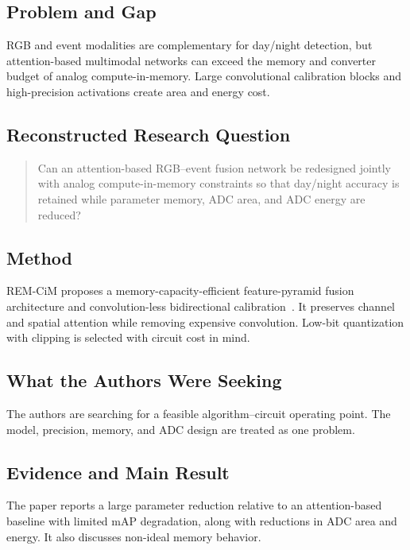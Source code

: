 \subsection{Problem and Gap}

RGB and event modalities are complementary for day/night detection, but attention-based multimodal networks can exceed the memory and converter budget of analog compute-in-memory. Large convolutional calibration blocks and high-precision activations create area and energy cost.

\subsection{Reconstructed Research Question}

\begin{quote}
Can an attention-based RGB--event fusion network be redesigned jointly with analog compute-in-memory constraints so that day/night accuracy is retained while parameter memory, ADC area, and ADC energy are reduced?
\end{quote}

\subsection{Method}

REM-CiM proposes a memory-capacity-efficient feature-pyramid fusion architecture and convolution-less bidirectional calibration~\cite{ichikawa2024remcim}. It preserves channel and spatial attention while removing expensive convolution. Low-bit quantization with clipping is selected with circuit cost in mind.

\subsection{What the Authors Were Seeking}

The authors are searching for a feasible algorithm--circuit operating point. The model, precision, memory, and ADC design are treated as one problem.

\subsection{Evidence and Main Result}

The paper reports a large parameter reduction relative to an attention-based baseline with limited mAP degradation, along with reductions in ADC area and energy. It also discusses non-ideal memory behavior.

